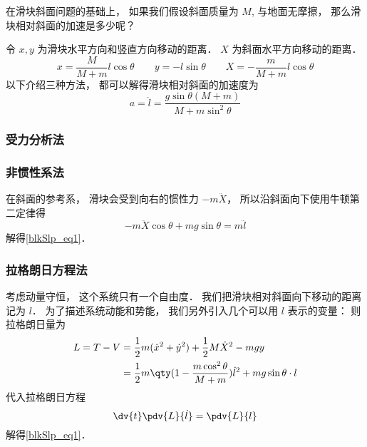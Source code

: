 \begin{issues}
\issueDraft
\end{issues}


在滑块斜面问题的基础上， 如果我们假设斜面质量为 $M$, 与地面无摩擦， 那么滑块相对斜面的加速是多少呢？

令 $x, y$ 为滑块水平方向和竖直方向移动的距离． $X$ 为斜面水平方向移动的距离．
\begin{equation}
x = \frac{M}{M + m}l\cos\theta
\qquad
y = -l\sin\theta
\qquad
X = -\frac{m}{M + m}l\cos\theta
\end{equation}
以下介绍三种方法， 都可以解得滑块相对斜面的加速度为
\begin{equation}\label{blkSlp_eq1}
a = \ddot l = \frac{g\sin\theta(M+m)}{M + m\sin^2\theta}
\end{equation}

\subsubsection{受力分析法}

\subsubsection{非惯性系法}
在斜面的参考系， 滑块会受到向右的惯性力 $-m\ddot X$， 所以沿斜面向下使用牛顿第二定律得
\begin{equation}
-m\ddot X\cos\theta + mg\sin\theta = m\ddot l
\end{equation}
解得\autoref{blkSlp_eq1}．

\subsubsection{拉格朗日方程法}
考虑动量守恒， 这个系统只有一个自由度． 我们把滑块相对斜面向下移动的距离记为 $l$． 为了描述系统动能和势能， 我们另外引入几个可以用 $l$ 表示的变量：  则拉格朗日量为
\begin{equation}
\begin{aligned}
L = T - V &= \frac12 m(\dot x^2 + \dot y^2) + \frac12 M \dot X^2 - mgy\\
&= \frac{1}{2}m \qty(1 - \frac{m\cos^2\theta}{M + m}) \dot l^2 + mg\sin\theta \cdot l
\end{aligned}
\end{equation}
代入拉格朗日方程
\begin{equation}
\dv{t} \pdv{L}{\dot l} = \pdv{L}{l}
\end{equation}
解得\autoref{blkSlp_eq1}．

